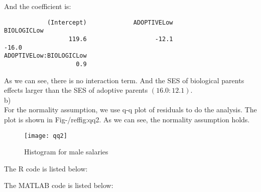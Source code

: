 \documentclass[12pt]{article}
\begin{document}
And the coefficient is:

\begin{verbatim}
            (Intercept)             ADOPTIVELow             BIOLOGICLow 
                  119.6                   -12.1                   -16.0 
ADOPTIVELow:BIOLOGICLow 
                    0.9
\end{verbatim}

As we can see, there is no interaction term. And the SES of biological
parents effects larger than the SES of adoptive parents
$(16.0:12.1)$. \\

b) \\

For the normality assumption, we use q-q plot of residuals to do
the analysis. The plot is shown in Fig-/ref{fig:qq2}. As we can see,
the normality assumption holds.

\begin{figure}[ht!]
  \centering
  \texttt{[image: qq2]}
  \caption{Histogram for male salaries \label{fig:qq2}}
\end{figure}

\appendix
\appendixpage
\addappheadtotoc

The R code is listed below:



The MATLAB code is listed below:


\end{document}
